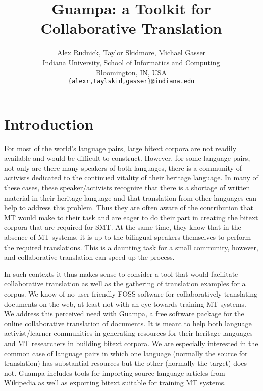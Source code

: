 \documentclass[10pt, a4paper]{article}
\title{Guampa: a Toolkit for Collaborative Translation}
\author{Alex Rudnick, Taylor Skidmore, Michael Gasser \\
        Indiana University, School of Informatics and Computing \\
        Bloomington, IN, USA\\
        {\tt \{alexr,taylskid,gasser\}@indiana.edu}}
\date{}
\begin{document}
\maketitle
\thispagestyle{empty}

\section{Introduction}
For most of the world's language pairs, large bitext corpora are not readily
available and would be difficult to construct. However, for some language
pairs, not only are there many speakers of both languages, there is a community
of activists dedicated to the continued vitality of their heritage language. In
many of these cases, these speaker/activists recognize that there is a shortage
of written material in their heritage language and that translation from other
languages can help to address this problem. Thus they are often aware of the
contribution that MT would make to their task and are eager to do their part in
creating the bitext corpora that are required for SMT. At the same time, they
know that in the absence of MT systems, it is up to the bilingual speakers
themselves to perform the required translations. This is a daunting task for a
small community, however, and collaborative translation can speed up the
process.

In such contexts it thus makes sense to consider a tool that would facilitate
collaborative translation as well as the gathering of translation examples for
a corpus. We know of no user-friendly FOSS software for collaboratively
translating documents on the web, at least not with an eye towards training MT
systems. We address this perceived need with Guampa, a free software package
for the online collaborative translation of documents. It is meant to help both
language activist/learner communities in generating resources for their
heritage languages and MT researchers in building bitext corpora. We are
especially interested in the common case of language pairs in which one
language (normally the source for translation) has substantial resources but
the other (normally the target) does not. Guampa includes tools for importing
source language articles from Wikipedia as well as exporting bitext suitable
for training MT systems.
\end{document}
